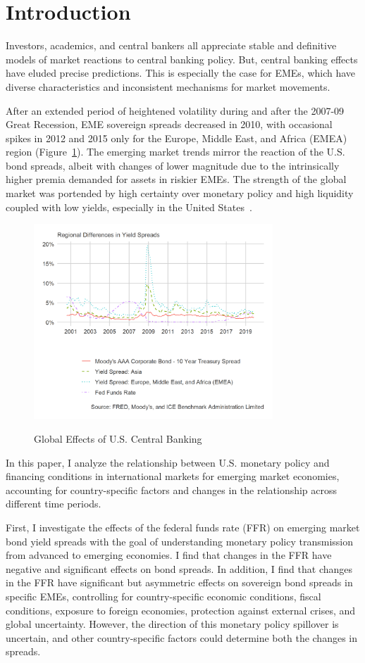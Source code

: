 \documentclass[12pt]{article}
\begin{document}
\section{Introduction}
Investors, academics, and central bankers all appreciate stable and definitive models of market reactions to central banking policy. But, central banking effects have eluded precise predictions. This is especially the case for EMEs, which have diverse characteristics and inconsistent mechanisms for market movements.

After an extended period of heightened volatility during and after the 2007-09 Great Recession, EME sovereign spreads decreased in 2010, with occasional spikes in 2012 and 2015 only for the Europe, Middle East, and Africa (EMEA) region (Figure~\ref{fig:globalfx}). The emerging market trends mirror the reaction of the U.S. bond spreads, albeit with changes of lower magnitude due to the intrinsically higher premia demanded for assets in riskier EMEs. The strength of the global market was portended by high certainty over monetary policy and high liquidity coupled with low yields, especially in the United States~\parencite{csonto13}.
\begin{figure}[h!]
\caption{Global Effects of U.S. Central Banking}
\centering
\includegraphics[width=0.8\textwidth]{globalfx.png}
\label{fig:globalfx}
\end{figure}
In this paper, I analyze the relationship between U.S. monetary policy and financing conditions in international markets for emerging market economies, accounting for country-specific factors and changes in the relationship across different time periods.

First, I investigate the effects of the federal funds rate (FFR) on emerging market bond yield spreads with the goal of understanding monetary policy transmission from advanced to emerging economies. I find that changes in the FFR have negative and significant effects on bond spreads. In addition, I find that changes in the FFR have significant but asymmetric effects on sovereign bond spreads in specific EMEs, controlling for country-specific economic conditions, fiscal conditions, exposure to foreign economies, protection against external crises, and global uncertainty. However, the direction of this monetary policy spillover is uncertain, and other country-specific factors could determine both the changes in spreads.
\end{document}
